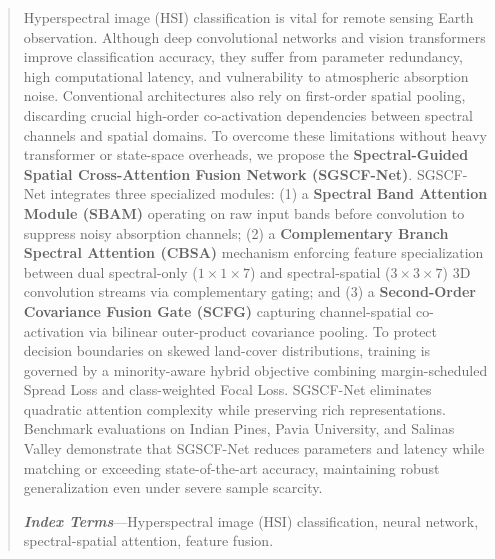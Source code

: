 \documentclass[manuscript,screen,review]{acmart}
\begin{document}
\begin{abstract}
Hyperspectral image (HSI) classification is vital for remote sensing Earth observation. Although deep convolutional networks and vision transformers improve classification accuracy, they suffer from parameter redundancy, high computational latency, and vulnerability to atmospheric absorption noise. Conventional architectures also rely on first-order spatial pooling, discarding crucial high-order co-activation dependencies between spectral channels and spatial domains. To overcome these limitations without heavy transformer or state-space overheads, we propose the \textbf{Spectral-Guided Spatial Cross-Attention Fusion Network (SGSCF-Net)}. SGSCF-Net integrates three specialized modules: 
(1) a \textbf{Spectral Band Attention Module (SBAM)} operating on raw input bands before convolution to suppress noisy absorption channels; 
(2) a \textbf{Complementary Branch Spectral Attention (CBSA)} mechanism enforcing feature specialization between dual spectral-only ($1\times 1\times 7$) and spectral-spatial ($3\times 3\times 7$) 3D convolution streams via complementary gating; and 
(3) a \textbf{Second-Order Covariance Fusion Gate (SCFG)} capturing channel-spatial co-activation via bilinear outer-product covariance pooling. 
To protect decision boundaries on skewed land-cover distributions, training is governed by a minority-aware hybrid objective combining margin-scheduled Spread Loss and class-weighted Focal Loss. SGSCF-Net eliminates quadratic attention complexity while preserving rich representations. Benchmark evaluations on Indian Pines, Pavia University, and Salinas Valley demonstrate that SGSCF-Net reduces parameters and latency while matching or exceeding state-of-the-art accuracy, maintaining robust generalization even under severe sample scarcity.

\vspace{1.2ex}
\noindent\textbf{\textit{Index Terms}}---Hyperspectral image (HSI) classification, neural network, spectral-spatial attention, feature fusion.
\end{abstract}
\end{document}

